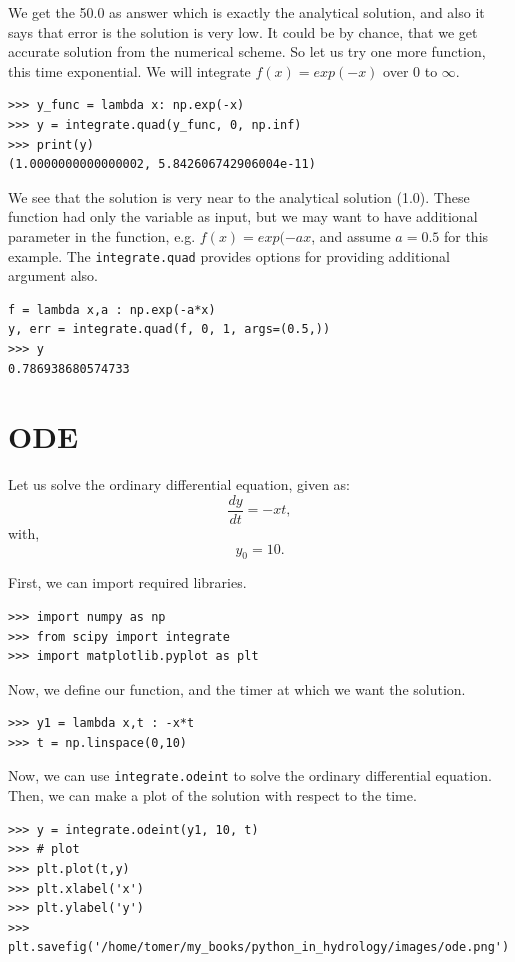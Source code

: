 \documentclass[10pt]{book}
\begin{document}
We get the 50.0 as answer which is exactly the analytical solution, and also it says that error is the solution is very low. It could be by chance, that we get accurate solution from the numerical scheme. So let us try one more function, this time exponential. We will integrate $f(x)=exp(-x)$ over 0 to $\infty$. 
\beforeverb \begin{verbatim}
>>> y_func = lambda x: np.exp(-x)
>>> y = integrate.quad(y_func, 0, np.inf)
>>> print(y)
(1.0000000000000002, 5.842606742906004e-11)
\end{verbatim} \afterverb
We see that the solution is very near to the analytical solution (1.0). These function had only the variable as input, but we may want to have additional parameter in the function, e.g. $f(x)=exp(-ax$, and assume $a=0.5$ for this example. The \verb"integrate.quad" provides options for providing additional argument also. 
\beforeverb \begin{verbatim}
f = lambda x,a : np.exp(-a*x)
y, err = integrate.quad(f, 0, 1, args=(0.5,))
>>> y
0.786938680574733
\end{verbatim} \afterverb


\section{ODE}
Let us solve the ordinary differential equation, given as:
\begin{equation}
\frac{dy}{dt} = -xt,
\end{equation}
with,
\begin{equation}
y_0 = 10.
\end{equation}

First, we can import required libraries.
\beforeverb \begin{verbatim}
>>> import numpy as np
>>> from scipy import integrate
>>> import matplotlib.pyplot as plt
\end{verbatim} \afterverb

Now, we define our function, and the timer at which we want the solution. 
\beforeverb \begin{verbatim}
>>> y1 = lambda x,t : -x*t
>>> t = np.linspace(0,10)
\end{verbatim} \afterverb

Now, we can use \verb"integrate.odeint" to solve the ordinary differential equation. Then, we can make a plot of the solution with respect to the time. 
\beforeverb \begin{verbatim}
>>> y = integrate.odeint(y1, 10, t)
>>> # plot
>>> plt.plot(t,y)
>>> plt.xlabel('x')
>>> plt.ylabel('y')
>>> plt.savefig('/home/tomer/my_books/python_in_hydrology/images/ode.png')
\end{verbatim} \afterverb
\end{document}
